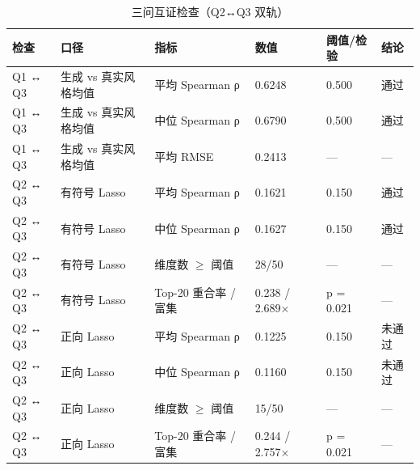 \begin{table}[tbp]
\centering
\caption{三问互证检查（Q2↔Q3 双轨）}
\label{tab:t10_consistency}
\footnotesize
\setlength{\tabcolsep}{3.5pt}
\begin{tabular}{llllll}
\toprule
检查 & 口径 & 指标 & 数值 & 阈值/检验 & 结论 \\
\midrule
Q1 ↔ Q3 & 生成 vs 真实风格均值 & 平均 Spearman ρ & 0.6248 & 0.500 & 通过 \\
Q1 ↔ Q3 & 生成 vs 真实风格均值 & 中位 Spearman ρ & 0.6790 & 0.500 & 通过 \\
Q1 ↔ Q3 & 生成 vs 真实风格均值 & 平均 RMSE & 0.2413 & — & — \\
Q2 ↔ Q3 & 有符号 Lasso & 平均 Spearman ρ & 0.1621 & 0.150 & 通过 \\
Q2 ↔ Q3 & 有符号 Lasso & 中位 Spearman ρ & 0.1627 & 0.150 & 通过 \\
Q2 ↔ Q3 & 有符号 Lasso & 维度数 $\geq$ 阈值 & 28/50 & — & — \\
Q2 ↔ Q3 & 有符号 Lasso & Top-20 重合率 / 富集 & 0.238 / 2.689$\times$ & p = 0.021 & — \\
Q2 ↔ Q3 & 正向 Lasso & 平均 Spearman ρ & 0.1225 & 0.150 & 未通过 \\
Q2 ↔ Q3 & 正向 Lasso & 中位 Spearman ρ & 0.1160 & 0.150 & 未通过 \\
Q2 ↔ Q3 & 正向 Lasso & 维度数 $\geq$ 阈值 & 15/50 & — & — \\
Q2 ↔ Q3 & 正向 Lasso & Top-20 重合率 / 富集 & 0.244 / 2.757$\times$ & p = 0.021 & — \\
\bottomrule
\end{tabular}
\end{table}
